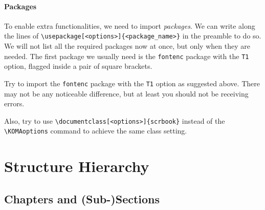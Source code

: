 \paragraph{Packages}
To enable extra functionalities, we need to import \textit{packages}. We can write along the lines of \texttt{\textbackslash usepackage[<options>]\{<package\_name>\}} in the preamble to do so. We will not list all the required packages now at once, but only when they are needed. The first package we usually need is the \verb|fontenc| package with the \verb|T1| option, flagged inside a pair of square brackets.

\begin{exercisebox}
\begin{Exercise}
Try to import the \verb|fontenc| package with the \verb|T1| option as suggested above. There may not be any noticeable difference, but at least you should not be receiving errors.
\end{Exercise}
\begin{Exercise}
Also, try to use \texttt{\textbackslash documentclass[<options>]\{scrbook\}} instead of the \texttt{\textbackslash KOMAoptions} command to achieve the same class setting.
\end{Exercise}
\end{exercisebox}

\section{Structure Hierarchy}

\subsection{Chapters and (Sub-)Sections}


